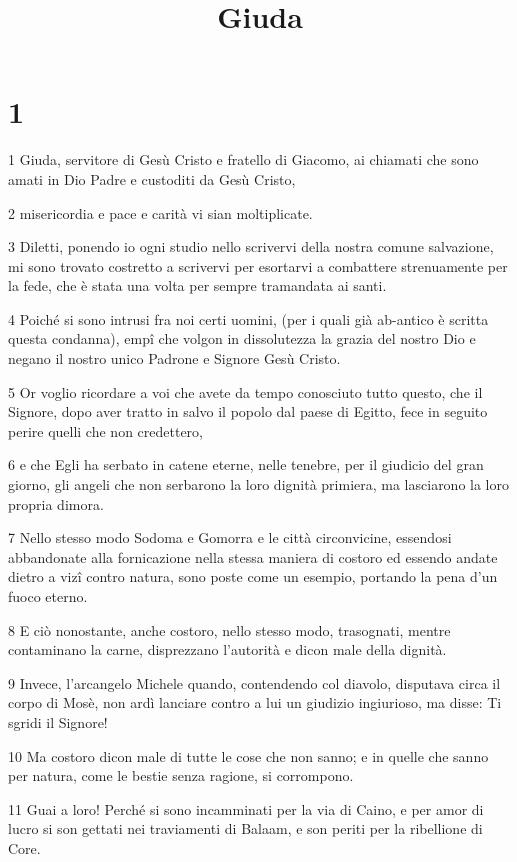 

\title{Giuda}


\chapter{1}

\par 1 Giuda, servitore di Gesù Cristo e fratello di Giacomo, ai chiamati che sono amati in Dio Padre e custoditi da Gesù Cristo,
\par 2 misericordia e pace e carità vi sian moltiplicate.
\par 3 Diletti, ponendo io ogni studio nello scrivervi della nostra comune salvazione, mi sono trovato costretto a scrivervi per esortarvi a combattere strenuamente per la fede, che è stata una volta per sempre tramandata ai santi.
\par 4 Poiché si sono intrusi fra noi certi uomini, (per i quali già ab-antico è scritta questa condanna), empî che volgon in dissolutezza la grazia del nostro Dio e negano il nostro unico Padrone e Signore Gesù Cristo.
\par 5 Or voglio ricordare a voi che avete da tempo conosciuto tutto questo, che il Signore, dopo aver tratto in salvo il popolo dal paese di Egitto, fece in seguito perire quelli che non credettero,
\par 6 e che Egli ha serbato in catene eterne, nelle tenebre, per il giudicio del gran giorno, gli angeli che non serbarono la loro dignità primiera, ma lasciarono la loro propria dimora.
\par 7 Nello stesso modo Sodoma e Gomorra e le città circonvicine, essendosi abbandonate alla fornicazione nella stessa maniera di costoro ed essendo andate dietro a vizî contro natura, sono poste come un esempio, portando la pena d'un fuoco eterno.
\par 8 E ciò nonostante, anche costoro, nello stesso modo, trasognati, mentre contaminano la carne, disprezzano l'autorità e dicon male della dignità.
\par 9 Invece, l'arcangelo Michele quando, contendendo col diavolo, disputava circa il corpo di Mosè, non ardì lanciare contro a lui un giudizio ingiurioso, ma disse: Ti sgridi il Signore!
\par 10 Ma costoro dicon male di tutte le cose che non sanno; e in quelle che sanno per natura, come le bestie senza ragione, si corrompono.
\par 11 Guai a loro! Perché si sono incamminati per la via di Caino, e per amor di lucro si son gettati nei traviamenti di Balaam, e son periti per la ribellione di Core.
